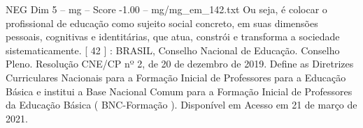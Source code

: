 \begin{textsample}{NEG Dim 5 – mg – Score -1.00 – mg/mg\_em\_142.txt}
Ou seja, é colocar o profissional de educação como sujeito social concreto, em suas dimensões pessoais, cognitivas e identitárias, que atua, constrói e transforma a sociedade sistematicamente. [ 42 ] : BRASIL, Conselho Nacional de Educação.
Conselho Pleno.
Resolução CNE/CP nº 2, de 20 de dezembro de 2019.
Define as Diretrizes Curriculares Nacionais para a Formação Inicial de Professores para a Educação Básica e institui a Base Nacional Comum para a Formação Inicial de Professores da Educação Básica ( BNC-Formação ).
Disponível em Acesso em 21 de março de 2021.

\end{textsample}
